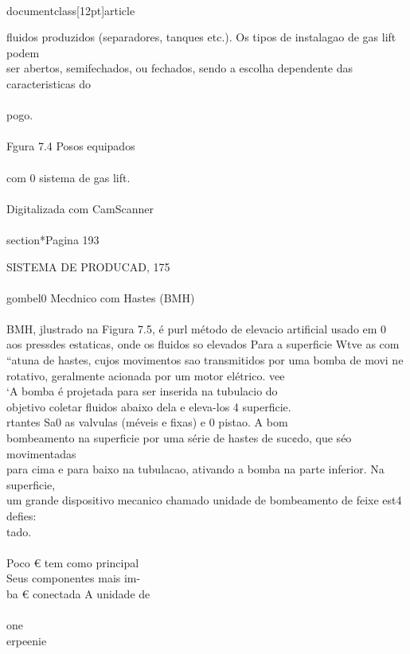 \\documentclass[12pt]{article}
\begin{document}
fluidos produzidos (separadores, tanques etc.). Os tipos de instalagao de gas lift podem\\
ser abertos, semifechados, ou fechados, sendo a escolha dependente das caracteristicas do\\
\\
pogo.\\
\\
Fgura 7.4 Posos equipados\\
\\
com 0 sistema de gas lift.\\
\\
Digitalizada com CamScanner\\

\\section*{Pagina 193}

SISTEMA DE PRODUCAD, 175\\
\\
gombel0 Mecdnico com Hastes (BMH)\\
\\
BMH, jlustrado na Figura 7.5, é purl método de elevacio artificial usado em 0\\
aos pressdes estaticas, onde os fluidos so elevados Para a superficie Wtve as com\\
“atuna de hastes, cujos movimentos sao transmitidos por uma bomba de movi ne\\
rotativo, geralmente acionada por um motor elétrico. vee\\
‘A bomba é projetada para ser inserida na tubulacio do\\
objetivo coletar fluidos abaixo dela e eleva-los 4 superficie.\\
rtantes Sa0 as valvulas (méveis e fixas) e 0 pistao. A bom\\
bombeamento na superficie por uma série de hastes de suc¢do, que séo movimentadas\\
para cima e para baixo na tubulacao, ativando a bomba na parte inferior. Na superficie,\\
um grande dispositivo mecanico chamado unidade de bombeamento de feixe est4 defies:\\
tado.\\
\\
Poco € tem como principal\\
Seus componentes mais im-\\
ba € conectada A unidade de\\
\\
one\\
erpeenie\\
\end{document}
